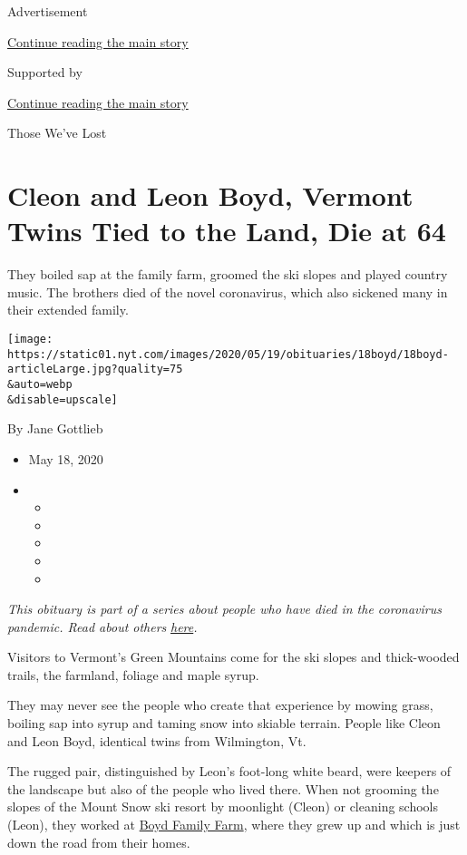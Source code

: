 Advertisement

\protect\hyperlink{after-top}{Continue reading the main story}

Supported by

\protect\hyperlink{after-sponsor}{Continue reading the main story}

Those We've Lost

\hypertarget{cleon-and-leon-boyd-vermont-twins-tied-to-the-land-die-at-64}{%
\section{Cleon and Leon Boyd, Vermont Twins Tied to the Land, Die at
64}\label{cleon-and-leon-boyd-vermont-twins-tied-to-the-land-die-at-64}}

They boiled sap at the family farm, groomed the ski slopes and played
country music. The brothers died of the novel coronavirus, which also
sickened many in their extended family.

\texttt{[image: https://static01.nyt.com/images/2020/05/19/obituaries/18boyd/18boyd-articleLarge.jpg?quality=75\\\&auto=webp\\\&disable=upscale]}

By Jane Gottlieb

\begin{itemize}
\item
  May 18, 2020
\item
  \begin{itemize}
  \item
  \item
  \item
  \item
  \item
  \end{itemize}
\end{itemize}

\emph{This obituary is part of a series about people who have died in
the coronavirus pandemic. Read about others}
\href{https://www.nytimes.com/series/people-who-have-died-of-the-coronavirus}{\emph{here}}\emph{.}

Visitors to Vermont's Green Mountains come for the ski slopes and
thick-wooded trails, the farmland, foliage and maple syrup.

They may never see the people who create that experience by mowing
grass, boiling sap into syrup and taming snow into skiable terrain.
People like Cleon and Leon Boyd, identical twins from Wilmington, Vt.

The rugged pair, distinguished by Leon's foot-long white beard, were
keepers of the landscape but also of the people who lived there. When
not grooming the slopes of the Mount Snow ski resort by moonlight
(Cleon) or cleaning schools (Leon), they worked at
\href{http://boydfamilyfarm.com/}{Boyd Family Farm}, where they grew up
and which is just down the road from their homes.

